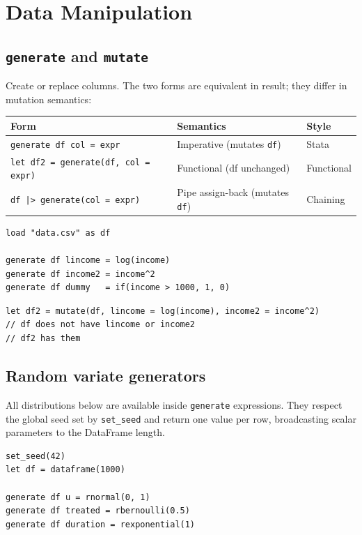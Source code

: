 \chapter{Data Manipulation}

\section{\texttt{generate} and \texttt{mutate}}

Create or replace columns. The two forms are equivalent in result; they
differ in mutation semantics:

\begin{center}
\begin{tabular}{lll}
\toprule
\textbf{Form} & \textbf{Semantics} & \textbf{Style} \\
\midrule
\texttt{generate df col = expr}              & Imperative (mutates \texttt{df}) & Stata \\
\texttt{let df2 = generate(df, col = expr)}  & Functional (df unchanged)        & Functional \\
\texttt{df |> generate(col = expr)}          & Pipe assign-back (mutates \texttt{df}) & Chaining \\
\bottomrule
\end{tabular}
\end{center}

\begin{lstlisting}[caption={generate: imperative form}]
load "data.csv" as df

generate df lincome = log(income)
generate df income2 = income^2
generate df dummy   = if(income > 1000, 1, 0)
\end{lstlisting}

\begin{lstlisting}[caption={mutate: functional form}]
let df2 = mutate(df, lincome = log(income), income2 = income^2)
// df does not have lincome or income2
// df2 has them
\end{lstlisting}

\section{Random variate generators}

All distributions below are available inside \lstinline{generate} expressions.
They respect the global seed set by \lstinline{set_seed} and return one value per
row, broadcasting scalar parameters to the DataFrame length.

\begin{lstlisting}[caption={Simulating data}]
set_seed(42)
let df = dataframe(1000)

generate df u = rnormal(0, 1)
generate df treated = rbernoulli(0.5)
generate df duration = rexponential(1)
\end{lstlisting}

